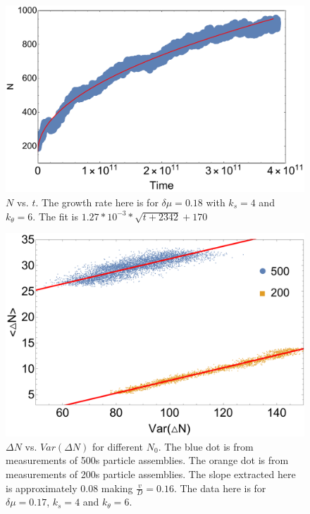 \documentclass[amsmath,preprintnumbers,10pt,nofootinbib,prl,twocolumn]{revtex4-1}
\begin{document}
\begin{figure}
\centering
\includegraphics[scale=0.3]{longtrajectoryFig2.pdf}
\caption{$N$ vs. $t$. The growth rate here is for $\delta \mu = 0.18$ with $k_s=4$ and $k_\theta = 6$. The fit is $1.27*10^{-3}*\sqrt{t+2342}+170$}\label{fig:GrowthRate}
\end{figure}
\begin{figure}[tbp]
\centering
\includegraphics[scale=0.4]{deltaNvsVarFig3.pdf}
\caption{$\Delta N$ vs. $Var(\Delta N)$ for different $N_0$. The blue dot is from measurements of 500s particle assemblies. The orange dot is from measurements of 200s particle assemblies. The slope extracted here is approximately 0.08 making $\frac{v}{D}=0.16$. The data here is for $\delta\mu=0.17$, $k_s=4$ and $k_\theta = 6$.} \label{fig:growthvsvariance}
\end{figure}
\end{document}
